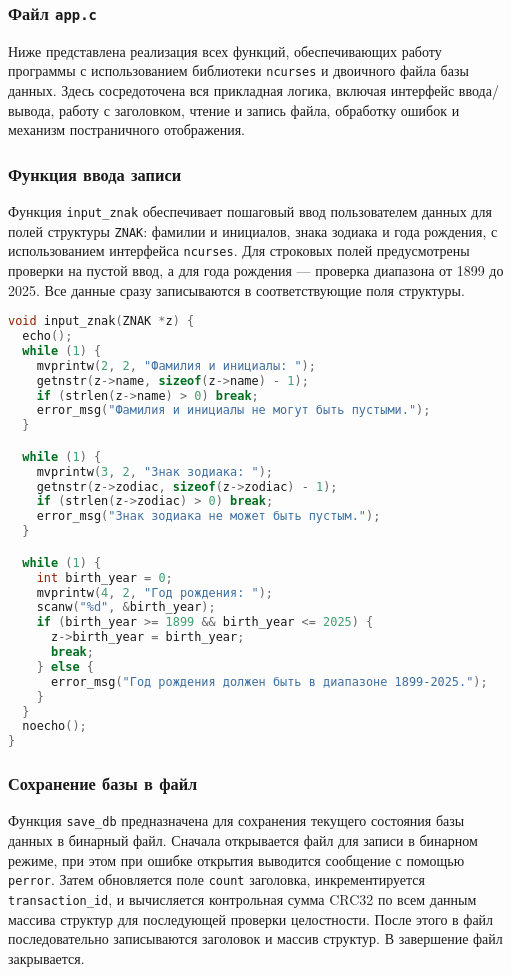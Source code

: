 \subsubsection*{Файл \texttt{app.c}}

Ниже представлена реализация всех функций, обеспечивающих работу программы с использованием библиотеки \texttt{ncurses} и двоичного файла базы данных. Здесь сосредоточена вся прикладная логика, включая интерфейс ввода/вывода, работу с заголовком, чтение и запись файла, обработку ошибок и механизм постраничного отображения.

\subsubsection*{Функция ввода записи}

Функция \texttt{input\_znak} обеспечивает пошаговый ввод пользователем данных для полей структуры \texttt{ZNAK}: фамилии и инициалов, знака зодиака и года рождения, с использованием интерфейса \texttt{ncurses}. Для строковых полей предусмотрены проверки на пустой ввод, а для года рождения — проверка диапазона от 1899 до 2025. Все данные сразу записываются в соответствующие поля структуры.

\begin{lstlisting}[language=C, caption=Функция input\_znak]
void input_znak(ZNAK *z) {
  echo();
  while (1) {
    mvprintw(2, 2, "Фамилия и инициалы: ");
    getnstr(z->name, sizeof(z->name) - 1);
    if (strlen(z->name) > 0) break;
    error_msg("Фамилия и инициалы не могут быть пустыми.");
  }

  while (1) {
    mvprintw(3, 2, "Знак зодиака: ");
    getnstr(z->zodiac, sizeof(z->zodiac) - 1);
    if (strlen(z->zodiac) > 0) break;
    error_msg("Знак зодиака не может быть пустым.");
  }

  while (1) {
    int birth_year = 0;
    mvprintw(4, 2, "Год рождения: ");
    scanw("%d", &birth_year);
    if (birth_year >= 1899 && birth_year <= 2025) {
      z->birth_year = birth_year;
      break;
    } else {
      error_msg("Год рождения должен быть в диапазоне 1899-2025.");
    }
  }
  noecho();
}
\end{lstlisting}

\subsubsection*{Сохранение базы в файл}

Функция \texttt{save\_db} предназначена для сохранения текущего состояния базы данных в бинарный файл. Сначала открывается файл для записи в бинарном режиме, при этом при ошибке открытия выводится сообщение с помощью \texttt{perror}. Затем обновляется поле \texttt{count} заголовка, инкрементируется \texttt{transaction\_id}, и вычисляется контрольная сумма CRC32 по всем данным массива структур для последующей проверки целостности. После этого в файл последовательно записываются заголовок и массив структур. В завершение файл закрывается.


